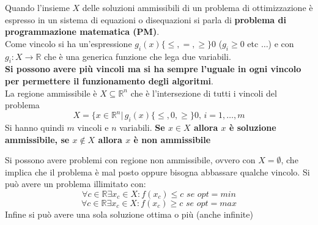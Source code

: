 \message{ !name(ro.tex)}\documentclass[a4paper,12pt, oneside]{book}
\begin{document}
\begin{definizione}
  Quando l'insieme $X$ delle soluzioni ammissibili di un problema di
  ottimizzazione è espresso in un sistema di equazioni o disequazioni si
  parla di \textbf{problema di programmazione matematica (PM)}.\\
  Come vincolo si ha un'espressione $g_i(x)\{\leq, =, \geq\} 0$
  ($g_i\geq 0$ etc $\ldots$) e con
  $g_i:X\to \mathbb{R}$ che è una generica funzione che lega due
  variabili. \\
  \textbf{Si possono avere più vincoli ma si ha sempre l'uguale in ogni
    vincolo per permettere il funzionamento degli algoritmi}.\\
  La regione ammissibile è $X\subseteq\mathbb{R}^n$ che è l'intersezione
  di tutti i vincoli del problema
  \[X=\{x\in\mathbb{R}^n|\, g_i(x)\{\leq, 0, \geq\}0,\,i=1,\ldots,m\]
  Si hanno quindi $m$ vincoli e $n$ variabili.
  \textbf{Se $x \in X$ allora $x$ è soluzione ammissibile,
    se $x \not\in X$ allora $x$ è non ammissibile}
\end{definizione}
Si possono avere problemi con regione non ammissibile, ovvero con
$X=\emptyset$, che implica che il problema è mal posto oppure bisogna
abbassare qualche vincolo. Si può avere un problema illimitato con:
\[\forall c \in \mathbb{R}\exists x_c\in X:f(x_c)\leq c\,\, se\,\,
  opt = min\]
\[\forall c \in \mathbb{R}\exists x_c\in X:f(x_c)\geq c\,\, se\,\,
  opt = max\]
Infine si può avere una sola soluzione ottima o più (anche infinite)
\end{document}
